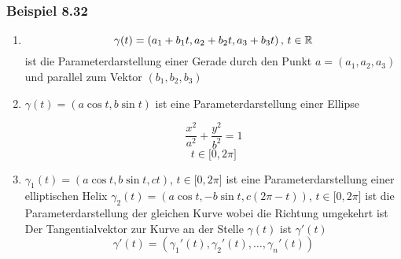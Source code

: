 \subsubsection*{Beispiel 8.32}
\begin{enumerate}
\item \[\gamma (t)=\left( a_1 +b_1 t,a_2 +b_2 t,a_3 +b_3 t\right)\text{, }t\in\mathbb{R}\]
ist die Parameterdarstellung einer Gerade durch den Punkt $a=\left( a_1,a_2,a_3\right)$ und parallel zum Vektor $\left( b_1,b_2,b_3\right)$

\begin{center}
\end{center}

\item $\gamma (t)=\left( a\cos t,b\sin t\right)$ ist eine Parameterdarstellung einer Ellipse
\begin{figure}[H]
\begin{minipage}[b]{0.45\linewidth}

\[\frac{x^2}{a^2}+\frac{y^2}{b^2}=1\]
\[t\in\lbrack 0,2\pi\rbrack\]
\end{minipage}
\hspace{0.5cm}
\begin{minipage}[b]{0.45\linewidth}

\begin{center}
\end{center}

\end{minipage}
\end{figure}
\item $\gamma_1 (t)=\left( a\cos t,b\sin t, ct\right)$, $t\in\lbrack 0,2\pi\rbrack$ ist eine Parameterdarstellung einer elliptischen Helix
$\gamma_2 (t)=\left( a\cos t,-b\sin t, c(2\pi -t)\right)$, $t\in\lbrack 0,2\pi\rbrack$ ist die Parameterdarstellung der gleichen Kurve wobei die Richtung umgekehrt ist
Der Tangentialvektor zur Kurve an der Stelle $\gamma (t)$ ist $\gamma' (t)$ \[\gamma'(t)=\left( \gamma_1'(t),\gamma_2'(t),\dots, \gamma_n'(t)\right)\]
\end{enumerate}

